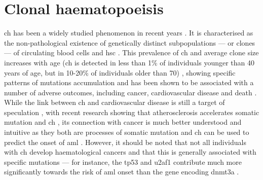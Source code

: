 \section{Clonal haematopoeisis}

\Ac{ch} has been a widely studied phenomenon in recent years \cite{Jaiswal2014-rl,Genovese2014-eu,Xie2014-np,McKerrell2015-rl,Fabre2020-as,Dawoud2020-af}. It is characterised as the non-pathological existence of genetically distinct subpopulations --- or clones --- of circulating blood cells and \ac{hsc} \cite{Jan2017-rc}. This prevalence of \ac{ch} and average clone size increases with age (\ac{ch} is detected in less than 1\% of individuals younger than 40 years of age, but in 10-20\% of individuals older than 70) \cite{Jaiswal2014-rl}, showing specific patterns of mutations accumulation \cite{McKerrell2015-rl} and has been shown to be associated with a number of adverse outcomes, including cancer, cardiovascular disease and death \cite{Jaiswal2014-rl,Saleheen2017-eq,Genovese2014-eu,Desai2018-pj,Abelson2018-wh}. While the link between \ac{ch} and cardiovascular disease is still a target of speculation \cite{Evans2021-ae}, with recent research showing that atherosclerosis accelerates somatic mutation and \ac{ch} \cite{Heyde2021-nl}, its connection with cancer is much better understood and intuitive as they both are processes of somatic mutation and \ac{ch} can be used to predict the onset of \ac{aml} \cite{Desai2018-pj,Abelson2018-wh}. However, it should be noted that not all individuals with \ac{ch} develop haematological cancers and that this is generally associated with specific mutations --- for instance, the \ac{tp53} and \ac{u2af1} contribute much more significantly towards the risk of \ac{aml} onset than the gene encoding \ac{dnmt3a} \cite{Abelson2018-wh}.

